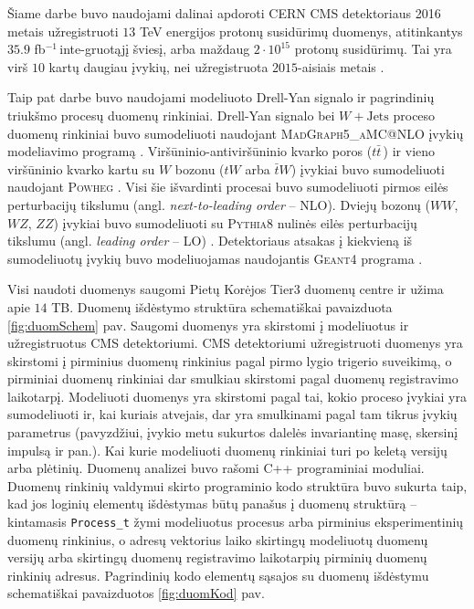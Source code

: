 \documentclass[a4paper, 12pt, twoside]{article}
\newcommand{\ttt}[1]{\texttt{#1}}
\newcommand{\WJets}{W\! +\!\mathrm{Jets}}
\newcommand{\invfb}{fb$^{-1}\,$}
\begin{document}
Šiame darbe buvo naudojami dalinai apdoroti CERN CMS detektoriaus 2016 metais užregistruoti $13$ TeV
energijos protonų susidūrimų duomenys, atitinkantys $35.9$ \invfb inte-gruotąjį šviesį, arba maždaug
$2 \cdot 10^{15}$ protonų susidūrimų.
Tai yra virš $10$ kartų daugiau įvykių, nei užregistruota $2015$-aisiais metais \cite{DY2018}.

Taip pat darbe buvo naudojami modeliuoto Drell-Yan signalo ir pagrindinių triukšmo procesų duomenų rinkiniai.
Drell-Yan signalo bei $\WJets$ proceso duomenų rinkiniai buvo sumodeliuoti naudojant
\textsc{MadGraph5\_aMC@NLO} įvykių modeliavimo programą \cite{MG_aMCatNLO}.
Viršūninio-antiviršūninio kvarko poros ($t\bar{t}\,$) ir vieno viršūninio kvarko kartu su $W$ bozonu ($tW$ arba
$\bar{t}W$) įvykiai buvo sumodeliuoti naudojant \textsc{Powheg} \cite{powheg_ttbar, powheg_tW}.
Visi šie išvardinti procesai buvo sumodeliuoti pirmos eilės perturbacijų tikslumu (angl.
\textit{next-to-leading order} -- NLO).
Dviejų bozonų ($WW$, $WZ$, $ZZ$) įvykiai buvo sumodeliuoti su \textsc{Pythia8} nulinės eilės perturbacijų tikslumu
(angl. \textit{leading order} -- LO) \cite{pythia82}.
Detektoriaus atsakas į kiekvieną iš sumodeliuotų įvykių buvo modeliuojamas naudojantis \textsc{Geant4} programa
\cite{geant4}.

Visi naudoti duomenys saugomi Pietų Korėjos Tier3 duomenų centre ir užima apie $14$ TB.
Duomenų išdėstymo struktūra schematiškai pavaizduota \ref{fig:duomSchem} pav.
Saugomi duomenys yra skirstomi į modeliuotus ir užregistruotus CMS detektoriumi.
CMS detektoriumi užregistruoti duomenys yra skirstomi į pirminius duomenų rinkinius pagal pirmo lygio trigerio
suveikimą, o pirminiai duomenų rinkiniai dar smulkiau skirstomi pagal duomenų registravimo laikotarpį.
Modeliuoti duomenys yra skirstomi pagal tai, kokio proceso įvykiai yra sumodeliuoti ir, kai kuriais atvejais,
dar yra smulkinami pagal tam tikrus įvykių parametrus (pavyzdžiui, įvykio metu sukurtos dalelės invariantinę masę,
skersinį impulsą ir pan.).
Kai kurie modeliuoti duomenų rinkiniai turi po keletą versijų arba plėtinių.
Duomenų analizei buvo rašomi C++ programiniai moduliai.
Duomenų rinkinių valdymui skirto programinio kodo struktūra buvo sukurta taip, kad jos loginių elementų išdėstymas
būtų panašus į duomenų struktūrą -- kintamasis \ttt{Process\_t} žymi modeliuotus procesus arba pirminius
eksperimentinių duomenų rinkinius, o adresų vektorius laiko skirtingų modeliuotų duomenų versijų arba skirtingų
duomenų registravimo laikotarpių pirminių duomenų rinkinių adresus.
Pagrindinių kodo elementų sąsajos su duomenų išdėstymu schematiškai pavaizduotos \ref{fig:duomKod} pav.
\end{document}
